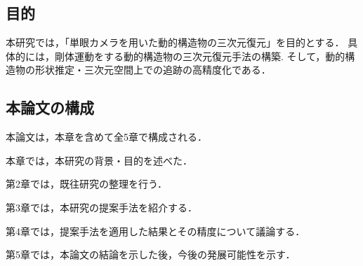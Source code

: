 \begin{comment}
動的物体を含む環境下でのVisual SLAMに関する研究の多くは，車といった動的物体を剛体と仮定し，カメラの姿勢推定および静的な背景の復元に重きを置いてきた．
そのため，動的物体の形状変化や表面の微小な変位をとらえようとしたVisual SLAMの研究は少ない．
動的な前景を物体ごとにセグメンテーションする際や動的物体を追跡する際に，物体を剛体仮定している既存手法が多いためである．
そのほかにも，動的物体が直線や円錐曲線上を動くと仮定して追跡する\cite{alcantarilla2012combining,avidan1999trajectory}など，動的物体の複雑な動きをとらえることのできる手法が適用された例は少ない．
動的物体の形状変化や微小な変位を高精度でとらえることができれば，そこから物体のひずみなどの有用な情報を得ることができる．

近年は機械学習の著しい進歩により，コンピュータービジョンの分野において深層学習に基づいた様々な技術の精度が向上している．
単眼深度推定やオプティカルフロー推定と呼ばれる技術の精度向上はよい例である．
単眼深度推定とは，単眼カメラでとらえた映像からそこに写っているものとの距離を推定する技術である．
単眼カメラからの画像のみでは，幾何学的に深度情報が得られない．
そこで近年，深層学習を用いて単眼カメラの画像のみから深度推定を行う手法が盛んに研究されてきた．
オプティカルフロー推定とは，連続する2フレーム間で対応する画素や特徴量のフロー（画像座標上での変位）を推定する技術である\cite{horn1981determining}．
従来オプティカルフローは，人の手によって作られた最適化目標を解く問題として推定されてきた\cite{chen2016full,horn1981determining,zach2007duality}が，近年はフローを直接推定する深層学習に基づく手法が，従来の手法を精度・速度の面で上回っている\cite{sun2018pwc,yang2019volumetric,ilg2017flownet}．
Visual SLAMにおいて深度推定の精度を向上させることで，動的物体の形状復元を高精度で行える．
また，オプティカルフロー推定の精度を向上させることで，物体の各画素の時空間的な動きを正確に捉えることができる．

動的物体と静的な背景のセグメンテーションを行ったうえで，深度推定とオプティカルフロー推定を動的物体に対して高精度に行うことで，動的物体の形状変化や微小な変位の追跡を行うことが可能となる．

\end{comment}


\subsection{目的}\label{subsec:objective}

本研究では，「単眼カメラを用いた動的構造物の三次元復元」を目的とする．
具体的には，剛体運動をする動的構造物の三次元復元手法の構築.
そして，動的構造物の形状推定・三次元空間上での追跡の高精度化である．

\subsection{本論文の構成}\label{subsec:construction}

本論文は，本章を含めて全5章で構成される．

本章では，本研究の背景・目的を述べた．

第2章では，既往研究の整理を行う．

第3章では，本研究の提案手法を紹介する．

第4章では，提案手法を適用した結果とその精度について議論する．

第5章では，本論文の結論を示した後，今後の発展可能性を示す．